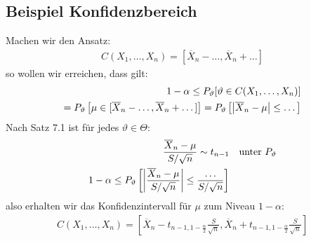 \documentclass[8pt]{extarticle}
\newcommand{\vt}{\vartheta}
\newcommand{\zufallsvariablen}{X_1, \dots, X_n}
\begin{document}
\begin{multicols*}{3}
  \subsection*{Beispiel Konfidenzbereich}
  Machen wir den Ansatz:
  \begin{align*}
    C (\zufallsvariablen) = [\overline{X}_n - \dots, \overline{X}_n + \dots]
  \end{align*}
  so wollen wir erreichen, dass gilt:
  \begin{align*}
    1 - \alpha \leq P_\vt[\vt \in  C (\zufallsvariablen)] \\
    = P_\vt \left[ \mu \in [\overline{X}_n - \dots, \overline{X}_n + \dots] \right]
    = P_\vt \left[ \abs{\overline{X}_n - \mu} \leq \dots \right]
  \end{align*}
  Nach Satz 7.1 ist für jedes $\vt \in \varTheta$:
  \begin{align*}
    \frac{\overline{X}_n - \mu}{S / \sqrt{n}} \sim t_{n-1} &  & \text{unter } P_\vt \\
    1 - \alpha \leq P_\vt \left[ \abs{\frac{\overline{X}_n - \mu}{S / \sqrt{n}}} \leq \frac{\dots}{S / \sqrt{n}} \right]
  \end{align*}
  also erhalten wir das Konfidenzintervall für $\mu$ zum Niveau $1 - \alpha$:
  \begin{align*}
    C (\zufallsvariablen) = \left[ \overline{X}_n - t_{n-1, 1 - \frac{\alpha}{2}} \frac{S}{\sqrt{n}}, \overline{X}_n + t_{n-1, 1 - \frac{\alpha}{2}} \frac{S}{\sqrt{n}} \right]
  \end{align*}

\end{multicols*}
\end{document}
